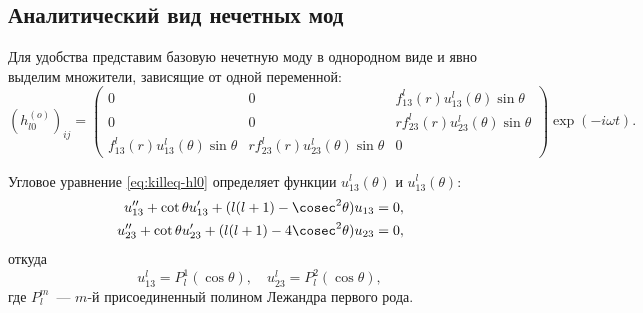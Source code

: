 \documentclass[\docroot/reports/draft/report.tex]{subfiles}
\begin{document}
\onlyinsubfile{\tableofcontents}

\subsection{Аналитический вид нечетных мод}

    Для удобства представим базовую нечетную моду в однородном виде и явно выделим множители, зависящие от одной переменной:
    \begin{equation}\label{eq:hl0e}
        (h_{l0}^{(o)})_{ij} = \begin{pmatrix}
            0&0&f^l_{13}(r)u^l_{13}(\theta)\sin\theta\\
            0&0&r f^l_{23}(r)u^l_{23}(\theta)\sin\theta\\
            f^l_{13}(r)u^l_{13}(\theta)\sin\theta &
                r f^l_{23}(r)u^l_{23}(\theta)\sin\theta & 0
        \end{pmatrix} \exp(-i \omega t).
    \end{equation}

    Угловое уравнение \autoref{eq:killeq-hl0} определяет функции $u^l_{13}(\theta)$ и $u^l_{13}(\theta)$:
    \begin{equation*}\begin{aligned}
        u''_{13} + \cot\theta u'_{13} + (l(l+1) - \cosec^2\theta) u_{13} &= 0, \\
        u''_{23} + \cot\theta u'_{23} + (l(l+1) - 4 \cosec^2\theta) u_{23} &= 0,
    \end{aligned}\end{equation*}
    откуда
    \begin{equation}\label{hl0o-u}
        u^l_{13} = P_l^1(\cos\theta), \quad u^l_{23} = P_l^2(\cos\theta),
    \end{equation}
    где $P_l^m$~--- $m$-й присоединенный полином Лежандра первого рода.
\end{document}
